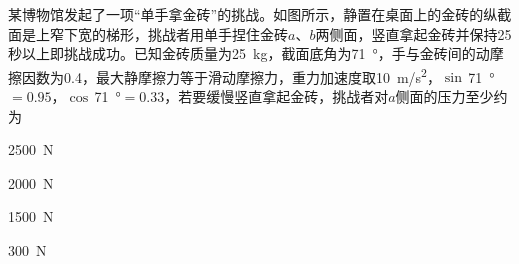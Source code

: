 某博物馆发起了一项“单手拿金砖”的挑战。如图所示，静置在桌面上的金砖的纵截面是上窄下宽的梯形，挑战者用单手捏住金砖\(a\)、\(b\)两侧面，竖直拿起金砖并保持25秒以上即挑战成功。已知金砖质量为\qty{25}{kg}，截面底角为\qty{71}{\degree}，手与金砖间的动摩擦因数为0.4，最大静摩擦力等于滑动摩擦力，重力加速度取\qty{10}{m/s^2}，\(\sin\)\,\qty{71}{\degree}\(= 0.95\)，\(\cos\)\,\qty{71}{\degree}\(= 0.33\)，若要缓慢竖直拿起金砖，挑战者对\(a\)侧面的压力至少约为\paren[]

\begin{choices}
	\item \qty{2500}{N}
	\item \qty{2000}{N}
	\item \qty{1500}{N}
	\item \qty{300}{N}
\end{choices}
\begin{answer}
    
\end{answer}